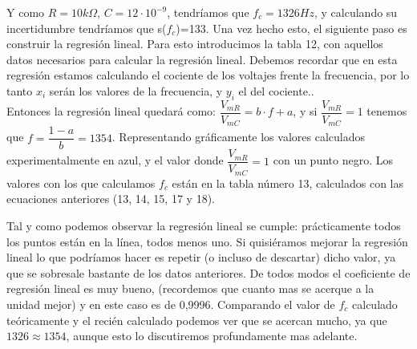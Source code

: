 \documentclass[10pt,a4paper]{article}
\begin{document}
Y como $R=10 k\Omega$, $C=12 \cdot 10^{-9}$, tendríamos que $f_c=1326 Hz $, y calculando su incertidumbre tendríamos que s($f_c$)=133. Una  vez hecho esto, el siguiente paso es construir la regresión lineal. Para esto introducimos la tabla 12, con aquellos datos necesarios para calcular la regresión lineal. Debemos recordar que en esta regresión estamos calculando el cociente de los voltajes frente la frecuencia, por lo tanto $x_i$ serán los valores de la frecuencia, y $y_i$ el del cociente.. \\

Entonces la regresión lineal quedará como: $\dfrac{V_{mR}}{V_{mC}} = b \cdot f + a $, y si $\dfrac{V_{mR}}{V_{mC}} = 1$ tenemos que $f=\dfrac{1-a}{b}=1354$. Representando gráficamente los valores calculados experimentalmente en azul, y el valor donde $\dfrac{V_{mR}}{V_{mC}}=1$ con un punto negro.
Los valores con los que calculamos $f_c$ están en la tabla número 13, calculados con las ecuaciones anteriores (13, 14, 15, 17 y 18). \


Tal y como podemos observar la regresión lineal se cumple: prácticamente todos los puntos están en la línea, todos menos uno. Si quisiéramos mejorar la regresión lineal lo que podríamos hacer es repetir (o incluso de descartar) dicho valor, ya que se sobresale bastante de los datos anteriores. De todos modos el coeficiente de regresión lineal es muy bueno, (recordemos que cuanto mas se acerque a la unidad mejor) y en este caso es de 0,9996. Comparando el valor de $f_c$ calculado teóricamente y el recién calculado podemos ver que se acercan mucho, ya que $1326 \approx 1354$, aunque esto lo discutiremos profundamente mas adelante. \\
\end{document}
